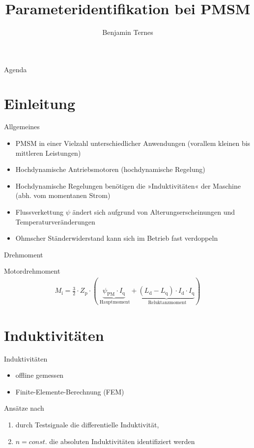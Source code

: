 \documentclass{beamer}
\title[Parameteridentifikation]{Parameteridentifikation bei PMSM}
\author[Benjamin Ternes]%
{%
Benjamin Ternes
}
\institute{%
Fachbereich Elektrotechnik und Informatik}
\renewcommand{\i}[1]{\mathrm{#1}}  				%
\begin{document}
\begin{frame}[plain]
	\titlepage
\end{frame}

\begin{frame}[plain]{Agenda}
	\tableofcontents
\end{frame}

\section{Einleitung}
\begin{frame}{Allgemeines}
\begin{itemize}
\item PMSM in einer Vielzahl unterschiedlicher Anwendungen (vorallem kleinen bis mittleren Leistungen)
\item Hochdynamische Antriebsmotoren (hochdynamische Regelung)
\item Hochdynamische Regelungen benötigen die »Induktivitäten« der Maschine (abh. vom momentanen Strom)
\item Flussverkettung $\psi$ ändert sich aufgrund von Alterungserscheinungen und Temperaturveränderungen
\item Ohmscher Ständerwiderstand kann sich im Betrieb fast verdoppeln
\end{itemize}
\end{frame}

\begin{frame}{Drehmoment}
\begin{block}{Motordrehmoment}
\begin{align}
M_\i{i}= \frac{3}{2}\cdot Z_\i{p} \cdot (\underbrace{\psi_\i{PM}\cdot I_\i{q}}_\i{\text{~Hauptmoment}} + \underbrace{(L_\i{d}-L_\i{q})\cdot I_\i{d}\cdot I_\i{q}}_\i{\text{~Reluktanzmoment}})
\end{align}
\end{block}
\end{frame}

\section{Induktivitäten}
\begin{frame}{Induktivitäten}
\begin{itemize}
\item offline gemessen
\item Finite-Elemente-Berechnung (FEM)
\end{itemize}
Ansätze nach \textcite{kellner2012}
\begin{enumerate}
\item durch Testsignale die differentielle Induktivität,
\item $n=const.$ die absoluten Induktivitäten identifiziert werden
\end{enumerate}
\end{frame}
\end{document}
